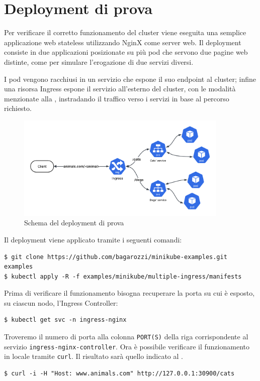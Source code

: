 \documentclass[12pt,a4paper,openright,twoside]{book}
\begin{document}
\section{Deployment di prova}
\label{sec:test-depl}
Per verificare il corretto funzionamento del cluster viene eseguita una semplice applicazione web stateless utilizzando NginX come server web. Il deployment consiste in due applicazioni
posizionate su più pod che servono due pagine web distinte, come per simulare l'erogazione di due servizi diversi.

I pod vengono racchiusi in un servizio che espone il suo endpoint al cluster; infine una risorsa Ingress espone il servizio all'esterno del cluster,
con le modalità menzionate alla , instradando il traffico verso i servizi in base al percorso richiesto.
\begin{figure}[!hbt]
    \centering
    \includegraphics[width=0.9\textwidth]{figures/test-deployment.png}
    \caption{Schema del deployment di prova}
    \label{fig:test-deployment}
\end{figure}
\FloatBarrier
Il deployment viene applicato tramite i seguenti comandi:
\begin{lstlisting}
$ git clone https://github.com/bagarozzi/minikube-examples.git examples
$ kubectl apply -R -f examples/minikube/multiple-ingress/manifests
\end{lstlisting}
Prima di verificare il funzionamento bisogna recuperare la porta su cui è esposto, su ciascun nodo, l'Ingress Controller:
\begin{lstlisting}
$ kubectl get svc -n ingress-nginx                
\end{lstlisting}
Troveremo il numero di porta alla colonna \texttt{PORT(S)} della riga corrispondente al servizio \texttt{ingress-nginx-controller}.
Ora è possibile verificare il funzionamento in locale tramite \texttt{curl}. Il risultato sarà quello indicato al .
\begin{lstlisting}
$ curl -i -H "Host: www.animals.com" http://127.0.0.1:30900/cats
\end{lstlisting}
\end{document}
